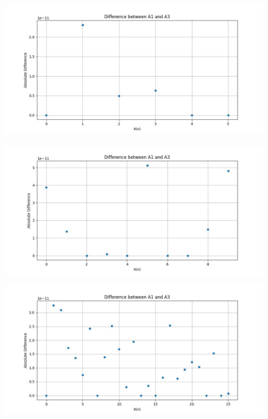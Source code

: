 \documentclass{article}
\begin{document}
\begin{figure}
    \centering
    \includegraphics[width=1\linewidth]{h2_plot_7.jpg}
    \label{fig:enter-label}
\end{figure}

\begin{figure}
    \centering
    \includegraphics[width=1\linewidth]{h2_plot_8.jpg}
    \label{fig:enter-label}
\end{figure}

\begin{figure}
    \centering
    \includegraphics[width=1\linewidth]{h2_plot_9.jpg}
    \label{fig:enter-label}
\end{figure}
\end{document}
